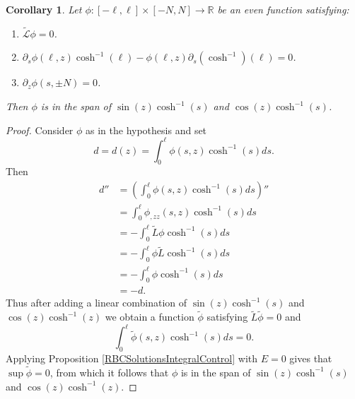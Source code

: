 \documentclass{amsart}
\newtheorem{corollary}{Corollary}
\newcommand{\mb}{\mathbb}
\newcommand{\wt}{\widetilde}
\begin{document}
 \begin{corollary} \label{WhatsInTheRobinKernelAgain}
 Let $\phi: [-\ell, \ell] \times [-N, N] \rightarrow \mb{R}$  be an even function satisfying:
 \begin{enumerate} 
 \item $\tilde{\mathcal{L}} \phi = 0$. 
\item $\partial_s\phi (\ell, z) \cosh^{-1}(\ell) - \phi(\ell, z)\partial_s\left(\cosh^{-1}\right)(\ell) = 0$.
\item $\partial_z \phi (s, \pm N) = 0 $.
 \end{enumerate}
 Then $\phi$ is in the span of $\sin(z) \cosh^{-1}(s)$ and $\cos(z) \cosh^{-1}(s)$.
 \end{corollary}
\begin{proof}
Consider $\phi$ as in the hypothesis and set 
\[
d = d(z) = \int_{0}^{\ell} \phi(s, z) \cosh^{-1} (s) ds.
\]
Then 
\begin{align*}
d'' & =  \left(\int_{0}^{\ell} \phi(s, z) \cosh^{-1} (s) ds \right)'' \\
& = \int_{0}^{\ell} \phi_{, zz}(s, z) \cosh^{-1} (s) ds \\
& = - \int_{0}^\ell \wt{L}\phi \cosh^{-1}(s) ds \\
& = -  \int_{0}^\ell\phi  \wt{L}\cosh^{-1}(s) ds \\
& = -  \int_{0}^\ell\phi \cosh^{-1}(s) ds \\
& = - d.
\end{align*}
Thus after adding a linear combination of $\sin(z) \cosh^{-1}(s)$ and $\cos(z) \cosh^{-1}(z)$ we obtain a function $\wt{\phi}$ satisfying $\wt{L} \wt{\phi} = 0$ and 
\[
 \int_{0}^{\ell} \wt{\phi}(s, z) \cosh^{-1} (s) ds = 0.
\]
Applying  Proposition \ref{RBCSolutionsIntegralControl} with $E = 0$ gives  that  $\sup \wt{\phi}  = 0$, from which it follows that $\phi$ is in the span of $\sin(z) \cosh^{-1}(s)$ and $\cos(z) \cosh^{-1}(z)$.
\end{proof}
\end{document}
